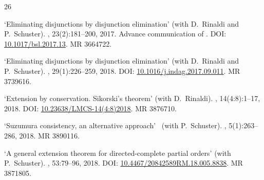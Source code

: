 \documentclass[a4paper]{article}
\begin{document}
\thispagestyle{empty}



\renewcommand\refname{Publications}

\renewcommand{\bibnumfmt}[1]{#1.}


% 
\begin{flushleft}

%

\begin{thebibliography}{26}

\newblock `Eliminating disjunctions by disjunction elimination' (with D.~Rinaldi and P.~Schuster).
, 23(2):181--200, 2017. Advance communication of \cite{rin:edde:full}.
\newblock DOI: \href{https://doi.org/10.1017/bsl.2017.13}{10.1017/bsl.2017.13}.
\newblock MR 3664722.

\newblock `Eliminating disjunctions by disjunction elimination' (with D.~Rinaldi and P.~Schuster).
, 29(1):226--259, 2018. %
\newblock DOI: \href{https://doi.org/10.1016/j.indag.2017.09.011}{10.1016/j.indag.2017.09.011}.
\newblock MR 3739616.

\newblock `Extension by conservation. {Sikorski's} theorem' (with D.~Rinaldi).
, 14(4:8):1--17, 2018.
\newblock DOI: \href{https://doi.org/10.23638/LMCS-14(4:8)2018}{10.23638/LMCS-14(4:8)2018}.
\newblock MR 3876710.

\newblock `{Suzumura} consistency, an alternative approach'~ (with P.~Schuster).
, 5(1):263--286, 2018.
\newblock MR 3890116.

\newblock `A general extension theorem for directed-complete partial orders' (with P.~Schuster).
, 53:79--96, 2018.
\newblock DOI: \href{https://doi.org/10.4467/20842589RM.18.005.8838}{10.4467/20842589RM.18.005.8838}.
\newblock MR 3871805.


\end{thebibliography}
\end{flushleft}
\end{document}
